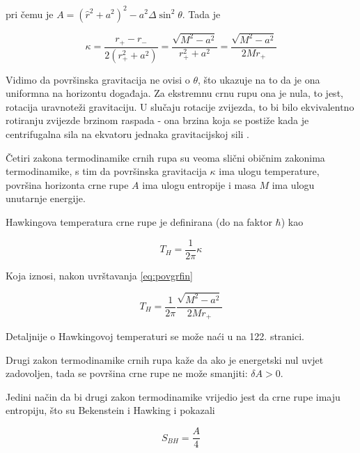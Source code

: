 \noindent pri čemu je $A=(\hat{r}^2+a^2)^2-a^2\Delta\sin^2\theta$. Tada je

\begin{equation}
\kappa=\frac{r_+-r_-}{2(r_+^2+a^2)}=\frac{\sqrt{M^2-a^2}}{r_+^2+a^2}=\frac{\sqrt{M^2-a^2}}{2Mr_+}
\label{eq:povgrfin}
\end{equation}

\noindent Vidimo da površinska gravitacija ne ovisi o $\theta$, što ukazuje na to da je ona uniformna na horizontu događaja. Za ekstremnu crnu rupu ona je nula, to jest, rotacija uravnoteži gravitaciju. U slučaju rotacije zvijezda, to bi bilo ekvivalentno rotiranju zvijezde brzinom raspada - ona brzina koja se postiže kada je centrifugalna sila na ekvatoru jednaka gravitacijskoj sili \citep{wald2010general, raine2005black}.

\newpage

Četiri zakona termodinamike crnih rupa su veoma slični običnim zakonima termodinamike, s tim da površinska gravitacija $\kappa$ ima ulogu temperature, površina horizonta crne rupe $A$ ima ulogu entropije i masa $M$ ima ulogu unutarnje energije.

\noindent Hawkingova temperatura crne rupe je definirana (do na faktor $\hbar$) kao 

\begin{equation}
T_H=\frac{1}{2\pi}\kappa
\end{equation}

\noindent Koja iznosi, nakon uvrštavanja \eqref{eq:povgrfin}

\begin{equation}
T_H=\frac{1}{2\pi}\frac{\sqrt{M^2-a^2}}{2Mr_+}
\end{equation}

\noindent Detaljnije o Hawkingovoj temperaturi se može naći u \citep{poissonrelativist} na 122. stranici.

\begin{mydef*}
Drugi zakon termodinamike crnih rupa kaže da ako je energetski nul uvjet zadovoljen, tada se površina crne rupe ne može smanjiti: $\delta A>0$. 
\end{mydef*}

Jedini način da bi drugi zakon termodinamike vrijedio jest da crne rupe imaju entropiju, što su Bekenstein i Hawking \citep{Bekenstein73, Hawking73} i pokazali

\begin{equation}
S_{BH}=\frac{A}{4}
\end{equation}

